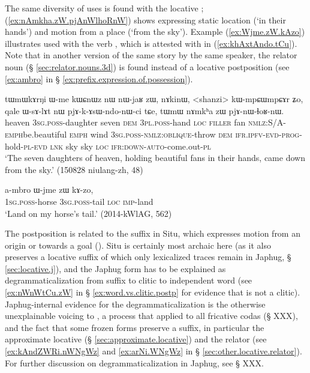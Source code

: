 The same diversity of uses is found with the locative ; (\ref{ex:nAmkha.zW.pjAnWlhoRnW}) shows  expressing static location (`in their hands') and motion from a place (`from the sky').  Example (\ref{ex:Wjme.zW.kAzo}) illustrates  used with the verb , which is attested with  in (\ref{ex:khAxtAndo.tCu}). Note that in another version of the same story by the same speaker, the relator noun  (§ \ref{sec:relator.nouns.3d}) is found instead of a locative postposition (see \ref{ex:ambro} in § \ref{ex:prefix.expression.of.possession}).

\begin{exe}
\ex \label{ex:nAmkha.zW.pjAnWlhoRnW}
\gll tɯmɯkɤrŋi ɯ-me kɯɕnɯz nɯ nɯ-jaʁ zɯ, nɤkinɯ, <shanzi> kɯ-mpɕɯ\redp{}mpɕɤr ʑo, qale ɯ-sɤ-lɤt nɯ pjɤ-k-ɤsɯ-ndo-nɯ-ci tɕe,  tɯmɯ nɤmkʰa zɯ pjɤ-nɯ-ɬoʁ-nɯ. \\
heaven \textsc{3sg}.\textsc{poss}-daughter seven \textsc{dem} \textsc{3pl}.\textsc{poss}-hand \textsc{loc} \textsc{filler} fan \textsc{nmlz}:S/A-\textsc{emph}\redp{}be.beautiful \textsc{emph} wind \textsc{3sg}.\textsc{poss}-\textsc{nmlz}:\textsc{oblique}-throw \textsc{dem} \textsc{ifr}.\textsc{ipfv}-\textsc{evd}-\textsc{prog}-hold-\textsc{pl}-\textsc{evd} \textsc{lnk} sky sky \textsc{loc} \textsc{ifr}:\textsc{down}-\textsc{auto}-come.out-\textsc{pl} \\
\glt `The seven daughters of heaven, holding beautiful fans in their hands, came down from the sky.' (150828 niulang-zh, 48)
\end{exe}

\begin{exe}
\ex \label{ex:Wjme.zW.kAzo}
\gll   a-mbro ɯ-jme zɯ kɤ-zo, \\
\textsc{1sg}.\textsc{poss}-horse \textsc{3sg}.\textsc{poss}-tail \textsc{loc} \textsc{imp}-land \\ 
\glt `Land on my horse's tail.' (2014-kWlAG, 562)
\end{exe}

The postposition  is related to the suffix  in Situ, which expresses motion from an origin or towards a goal (\citealt[330-331]{linxr93jiarongen}). Situ is certainly most archaic here (as it also preserves a locative  suffix of which only lexicalized traces remain in Japhug, § \ref{sec:locative.j}), and the Japhug form has to be explained as degrammaticalization  from suffix to clitic to independent word (see \ref{ex:nWnWtCu.zW} in § \ref{ex:word.vs.clitic.postp} for evidence that  is not a clitic). Japhug-internal evidence for the degrammaticalization is the otherwise unexplainable voicing to , a process that applied to all fricative codas (§ XXX), and the fact that some frozen forms preserve a  suffix, in particular the approximate locative  (§ \ref{sec:approximate.locative}) and the relator  (see \ref{ex:kAndZWRi.nWNgWz}  and \ref{ex:arNi.WNgWz}  in § \ref{sec:other.locative.relator}). For further discussion on degrammaticalization in Japhug, see § XXX.


